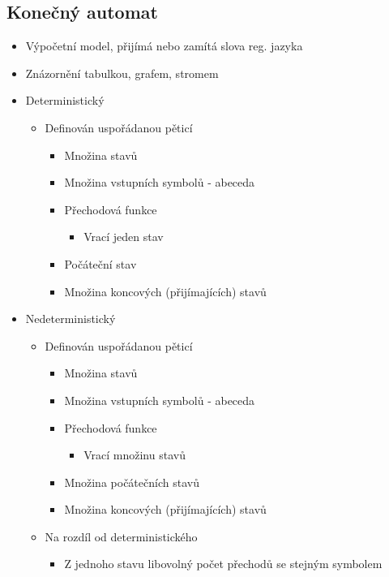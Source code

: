 \documentclass[openany]{book}
\begin{document}
\subsection{Konečný automat}
\begin{itemize}
    \item Výpočetní model, přijímá nebo zamítá slova reg. jazyka
    \item Znázornění tabulkou, grafem, stromem
    \item Deterministický
    \begin{itemize}
        \item Definován uspořádanou pěticí
        \begin{itemize}
            \item Množina stavů
            \item Množina vstupních symbolů - abeceda
            \item Přechodová funkce 
            \begin{itemize}
                \item Vrací jeden stav
            \end{itemize}
            \item Počáteční stav
            \item Množina koncových (přijímajících) stavů 
        \end{itemize}
    \end{itemize}
    \item Nedeterministický
    \begin{itemize}
        \item Definován uspořádanou pěticí
        \begin{itemize}
            \item Množina stavů
            \item Množina vstupních symbolů - abeceda
            \item Přechodová funkce
            \begin{itemize}
                \item Vrací množinu stavů
            \end{itemize}
            \item Množina počátečních stavů
            \item Množina koncových (přijímajících) stavů 
        \end{itemize}
        \item Na rozdíl od deterministického
        \begin{itemize}
            \item Z jednoho stavu libovolný počet přechodů se stejným symbolem

\end{itemize}
\end{itemize}
\end{itemize}
\end{document}
